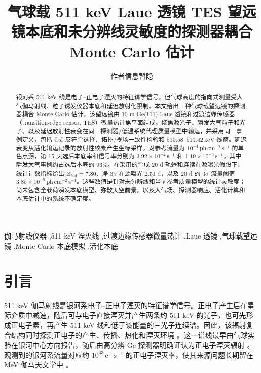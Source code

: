 \documentclass[preprint,12pt]{elsarticle}
\newcommand{\keV}{\,\mathrm{keV}}
\newcommand{\phcms}{\,\mathrm{ph\,cm^{-2}\,s^{-1}}}
\newcommand{\cps}{\,\mathrm{s^{-1}}}
\begin{document}
\begin{frontmatter}

\title{气球载 511 keV Laue 透镜 TES 望远镜本底和未分辨线灵敏度的探测器耦合 Monte Carlo 估计}

\author[inst1]{作者信息暂隐}
\address[inst1]{单位信息暂隐}

\begin{abstract}
银河系 511 keV 线是电子--正电子湮灭的特征谱学信号，但气球高度的指向式测量受大气伽马射线、粒子诱发仪器本底和延迟放射化限制。本文给出一种气球载望远镜的探测器耦合 Monte Carlo 估计，该望远镜由 10 m Ge(111) Laue 透镜和过渡边缘传感器（transition-edge sensor, TES）微量热计焦平面组成。聚焦源光子、瞬发大气粒子和光子、以及延迟放射性衰变在同一探测器/低温系统代理质量模型中输运，并采用同一事例定义，包括 CsI 反符合选择、拓扑/视场一致性检验和 $510.58$--$511.42\keV$ 线窗。延迟衰变从活化输运记录的放射性核素产生坐标采样。对参考流量为 $10^{-4}\phcms$ 的单色点源，第 15 天选后本底率和信号率分别为 $3.92\times10^{-2}\cps$ 和 $1.19\times10^{-3}\cps$，其中瞬发大气事例约占选后本底的 93\%。在采用的合成 20 d 轨迹和连续在源曝光假设下，统计计数指标给出 $Z_{20\mathrm{d}}=7.80$、净 $3\sigma$ 在源曝光 2.51 d，以及 20 d 的 $3\sigma$ 流量阈值 $3.85\times10^{-5}\phcms$。这些数值是针对未分辨线和当前参考质量模型的统计灵敏度；尚未包含全载荷瞬发本底模型、弥散天空前景，以及大气场、探测器响应、活化计算和本底估计中的系统不确定度。
\end{abstract}

\begin{keyword}
伽马射线仪器 \sep 511 keV 湮灭线 \sep 过渡边缘传感器微量热计 \sep Laue 透镜 \sep 气球载望远镜 \sep Monte Carlo 本底模拟 \sep 活化本底
\end{keyword}

\end{frontmatter}


\section{引言}
\label{sec:intro}

511 keV 伽马射线是银河系电子--正电子湮灭的特征谱学信号。正电子产生后在星际介质中减速，随后可与电子直接湮灭并产生两条约 511 keV 的光子，也可先形成正电子素，再产生 511 keV 线和低于该能量的三光子连续谱。因此，该辐射复合结构同时探测正电子的产生、传播、热化和湮灭环境 \cite{Prantzos2011,Jean2006}。这一谱线最早由气球实验在银河中心方向报告，随后由高分辨 Ge 探测器明确证认为正电子湮灭辐射 \cite{Prantzos2011}。观测到的银河系流量对应约 $10^{43}\,\mathrm{e^+\,s^{-1}}$ 的正电子湮灭率，使其来源问题长期留在 MeV 伽马天文学中 \cite{Prantzos2011,Kierans2020}。
\end{document}
